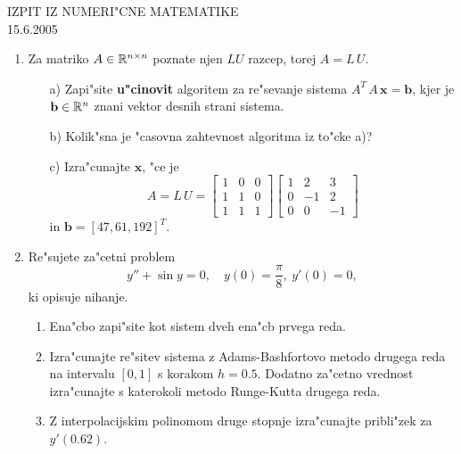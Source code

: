 

\begin{center}
  {\large IZPIT IZ NUMERI"CNE MATEMATIKE\\
    15.6.2005}
\end{center}
\vspace{1.5cm}
\begin{enumerate}
\item Za matriko $A\in\mathbb{R}^{n\times n}$ poznate njen $LU$ razcep,
        torej $A=L\,U$.
        \begin{itemize}
          \item[a)] Zapi"site {\bf u"cinovit} algoritem za 
            re"sevanje sistema $A^T\,A\,\mathbf{x}=\mathbf{b}$, kjer
            je $\mathbf{b}\in\mathbb{R}^n$ znani vektor desnih strani sistema.
          \item[b)] Kolik"sna je "casovna zahtevnost algoritma 
            iz to"cke a)?
          \item[c)] Izra"cunajte $\mathbf{x}$, "ce je
            $$
              A=L\,U=
              \left[
                \begin{array}{ccc}
                  1 & 0 & 0\\
                  1 & 1 & 0\\
                  1 & 1 & 1
                \end{array}
               \right]
               \left[
                \begin{array}{ccc}
                  1 & 2 & 3\\
                  0 & -1 & 2\\
                  0 & 0 & -1
                \end{array}
               \right]
            $$
            in $\mathbf{b}=[47,61,192]^T$.
                  \end{itemize}
        
      \item Re"sujete za"cetni problem
        $$y''+\sin{y}=0,\quad y(0)=\frac{\pi}{8},\ y'(0)=0,$$
        ki opisuje nihanje. 
        \begin{enumerate}
        \item Ena"cbo zapi"site kot sistem dveh ena"cb prvega reda.
        \item Izra"cunajte re"sitev sistema z Adams-Bashfortovo  
          metodo drugega reda na intervalu $[0,1]$ s korakom
          $h=0.5$. Dodatno za"cetno vrednost izra"cunajte
          s katerokoli metodo Runge-Kutta drugega reda.
        \item Z interpolacijskim polinomom druge stopnje 
          izra"cunajte pribli"zek za $y'(0.62)$.
        \end{enumerate}
      \end{enumerate}


